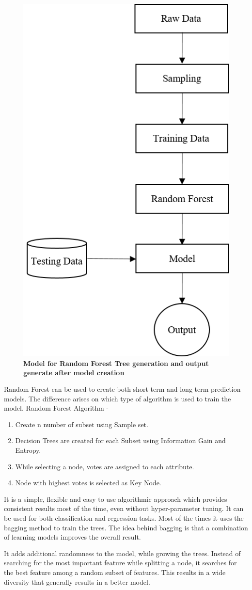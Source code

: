 \documentclass[BTech]{srmuthesis}
\begin{document}
\begin{figure}[H]
	\centering
	\includegraphics[width=0.4\linewidth]{Picture1.png}
	\caption{\bf Model for Random Forest Tree generation and output generate after model creation}
	\label{fig:RFModel}
\end{figure}

Random Forest can be used to create both short term and long term prediction models. The difference arises on which type of algorithm is used to train the model.
Random Forest Algorithm -

\begin{enumerate}
	\item Create n number of subset using Sample set.
	\item Decision Trees are created for each Subset using Information Gain and Entropy. 
	\item While selecting a node, votes are assigned to each attribute.
	\item Node with highest votes is selected as Key Node.
\end{enumerate}

It is a simple, flexible and easy to use algorithmic approach which provides consistent results most of the time, even without hyper-parameter tuning. It can be used for both classification and regression tasks. Most of the times it uses the bagging method to train the trees. The idea behind bagging is that a combination of learning models improves the overall result. 

It adds additional randomness to the model, while growing the trees. Instead of searching for the most important feature while splitting a node, it searches for the best feature among a random subset of features. This results in a wide diversity that generally results in a better model.
\end{document}
